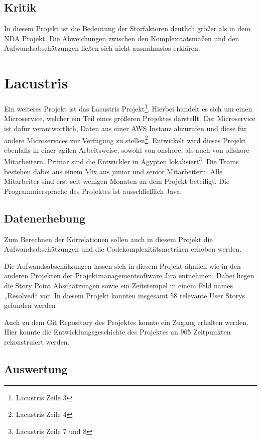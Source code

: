 \subsection{Kritik}\label{Alstonii-kritik}

In diesem Projekt ist die Bedeutung der Störfaktoren deutlich größer als
in dem NDA Projekt. Die Abweichungen zwischen den Komplexitätsmaßen und
den Aufwandsabschätzungen ließen sich nicht ausnahmslos erklären.

\section{Lacustris}\label{lacustris}

Ein weiteres Projekt ist das Lacustris Projekt\footnote{Lacustris
  Zeile 3}. Hierbei handelt es sich um einen Microservice, welcher ein
Teil eines größeren Projektes darstellt. Der Microservice ist dafür
verantwortlich, Daten aus einer AWS Instanz abzurufen und diese für
andere Microservices zur Verfügung zu stellen\footnote{Lacustris Zeile 4}.
Entwickelt wird dieses Projekt ebenfalls in einer agilen Arbeitsweise,
sowohl von onshore, als auch von offshore Mitarbeitern. Primär sind die
Entwickler in Ägypten lokalisiert\footnote{Lacustris Zeile 7 und 8}. Die
Teams bestehen dabei aus einem Mix aus junior und senior Mitarbeitern.
Alle Mitarbeiter sind erst seit wenigen Monaten an dem Projekt
beteiligt. Die Programmiersprache des Projektes ist ausschließlich Java.

\subsection{Datenerhebung}\label{lm-Datenerhebung}

Zum Berechnen der Korrelationen sollen auch in diesem Projekt die
Aufwandsabschätzungen und die Codekomplexitätsmetriken erhoben werden.

Die Aufwandsabschätzungen lassen sich in diesem Projekt ähnlich wie in
den anderen Projekten der Projektmanagementsoftware Jira entnehmen.
Dabei liegen die Story Point Abschätzungen sowie ein Zeitstempel in
einem Feld names „Resolved`` vor. In diesem Projekt konnten insgesamt 58
relevante User Storys gefunden werden

Auch zu dem Git Repository des Projektes konnte ein Zugang erhalten
werden. Hier konnte die Entwicklungsgeschichte des Projektes an 965
Zeitpunkten rekonstruiert werden.

\subsection{Auswertung}\label{lm-Auswertung}

